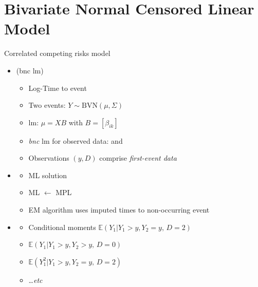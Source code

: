 \documentclass[10pt]{beamer}
\newcommand{\nologo}{\setbeamertemplate{logo}{}}
\begin{document}
  
 

\section{Bivariate Normal Censored Linear Model}

\begin{frame}{Correlated competing risks model}
  \begin{itemize}
  \item
    {\color{DarkBlue}{Bivariate Normal Censored Linear Model}} (bnc lm)
    \begin{itemize}
    \item
      Log-Time to {} event
    \item
      Two events: $Y \sim \mbox{BVN}(\mu,\Sigma) $
    \item
      lm: $\mu = X B$ with $B=\left[ \beta_{ik} \right]$
    \item
      \emph{bnc} lm for observed data: \color{red}{$y=\min (Y_1, Y_2, C)$} and  \color{red}{$D=1,2,0$}
    \item Observations $(y,D)$ comprise \emph{first-event data} 
    \end{itemize}
  \item
    {\color{DarkBlue}{Estimation}}
    \begin{itemize}
    \item ML solution 
    \item
      ML $\leftarrow$  MPL
    \item
      EM algorithm uses imputed times to non-occurring event
    \end{itemize}
  \item 
   {\color{DarkBlue}{Imputation}}
    \begin{itemize}
    \item Conditional moments
      \( \mathbb{E} (Y_1| Y_1 > y, Y_2=y, \, D=2) \)
    \item
      \( \mathbb{E} (Y_1| Y_1 > y, Y_2 > y, \, D=0) \)
    \item 
    \( \mathbb{E} (Y_1^2| Y_1> y, Y_2=y,\, D=2) \) 
    \item
    \ldots \emph{etc}
    \end{itemize}
  \end{itemize}
\end{frame}
\end{document}
